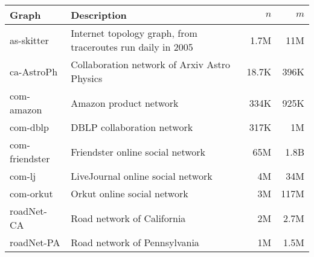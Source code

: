 \documentclass[11pt]{article}
\begin{document}
\begin{table}[ht!]
\vspace{-8pt}
\begin{center}
\begin{tabular}{|l|l|r|r|} %
\hline                        %
%
\scriptsize Graph
 & \scriptsize Description
 &\scriptsize $n$ &\scriptsize $m$
\\ %
\hline                  %
\scriptsize as-skitter  & \scriptsize Internet topology graph, from traceroutes run daily in 2005  & \scriptsize 1.7M& \scriptsize 11M\\
\scriptsize ca-AstroPh &\scriptsize Collaboration network of Arxiv Astro Physics &\scriptsize 18.7K& \scriptsize 396K\\
\scriptsize com-amazon&\scriptsize Amazon product network &\scriptsize 334K	& \scriptsize 925K\\
\scriptsize com-dblp &\scriptsize DBLP collaboration network &\scriptsize 317K	
	& \scriptsize 1M\\
\scriptsize com-friendster &\scriptsize Friendster online social network
 &\scriptsize 65M	
	& \scriptsize 1.8B\\
\scriptsize com-lj &\scriptsize LiveJournal online social network &\scriptsize 4M	
	& \scriptsize 34M\\
\scriptsize com-orkut &\scriptsize Orkut online social network &\scriptsize 3M	& \scriptsize 117M\\
\scriptsize roadNet-CA &\scriptsize Road network of California &\scriptsize 2M	& \scriptsize 2.7M\\
\scriptsize roadNet-PA &\scriptsize Road network of Pennsylvania &\scriptsize 1M	& \scriptsize 1.5M\\

\end{tabular}
\end{center}
\end{table}
\end{document}
